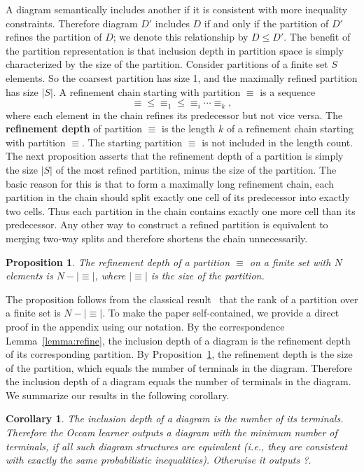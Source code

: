\documentclass{elsarticle}%
\newtheorem{corollary}[theorem]{Corollary}
\newtheorem{proposition}[theorem]{Proposition}
\newcommand{\tree}{D}
\newcommand{\isincluded}{\leq}
\newcommand{\partition}{\equiv}
\begin{document}
A diagram semantically includes another if it is consistent with more inequality constraints. Therefore diagram $\tree'$ includes $\tree$ if and only if the partition of $\tree'$ refines the partition of $\tree$; we denote this relationship by $\tree \isincluded \tree'$. 
The benefit of the partition representation is that inclusion depth in partition space is simply characterized by the size of the partition. Consider partitions of a finite set $S$ elements. So the coarsest partition has size 1, and the maximally refined partition has size $|S|$. A refinement chain starting with partition $\equiv$ is a sequence $$\equiv \isincluded \equiv_{1} \isincluded \equiv_{i} \cdots \equiv_{k},$$ where each element in the chain refines its predecessor but not vice versa. The \textbf{refinement depth} of partition $\equiv$ is the length $k$  of a refinement chain starting with partition $\equiv$. The starting partition $\equiv$ is not included in the length count.  The next proposition asserts that the refinement depth of a partition is simply the size $|S|$ of the most refined partition, minus the size of the partition. The basic reason for this is that to form a maximally long refinement chain, each partition in the chain should split exactly one cell of its predecessor into exactly two cells. Thus each partition in the chain contains exactly one more cell than its predecessor. Any other way to construct a refined partition is equivalent to merging two-way splits and therefore shortens the chain unnecessarily.

\begin{proposition}\label{char:refine-depth}
The refinement depth of a partition $\partition$ on a finite set with $N$ elements is $N-|\partition|$, where $|\partition|$ is the size of the partition.  
\end{proposition}
The proposition follows from the classical result~\cite{Lucas1990} that the rank of a partition over a finite set is $N-|\partition|$. To make the paper self-contained, we provide a direct proof in the appendix using our notation.
By the correspondence Lemma~\ref{lemma:refine}, the inclusion depth of a diagram is the refinement depth of its corresponding partition. By Proposition~\ref{char:refine-depth}, the refinement depth is the size of the partition, which equals the number of terminals in the diagram. Therefore the inclusion depth of a diagram equals the number of terminals in the diagram. We summarize our results in the following corollary.

\begin{corollary}
The inclusion depth of a diagram is the number of its terminals. Therefore
the Occam learner outputs a diagram with the minimum number of terminals, if all such diagram structures are equivalent (i.e., they are consistent with exactly the same probabilistic inequalities). Otherwise it outputs ?.
\end{corollary}
\end{document}
